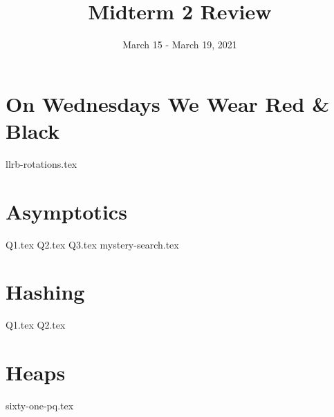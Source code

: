 \documentclass[11pt]{exam}
\title{Midterm 2 Review}
\date{March 15 - March 19, 2021}
\begin{document}
\maketitle

\section{On Wednesdays We Wear Red \& Black}
\begin{questions}
{llrb-rotations.tex}

\end{questions}

\section{Asymptotics}
\begin{questions}
{Q1.tex}
{Q2.tex}
\newpage
{Q3.tex}
{mystery-search.tex}

\end{questions}

\newpage
\section{Hashing}
\begin{questions}
{Q1.tex}
{Q2.tex}

\end{questions}

\newpage
\section{Heaps}
\begin{questions}
{sixty-one-pq.tex}

\end{questions}
\end{document}
